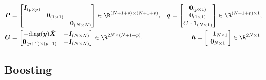         \begin{equation}
            \begin{aligned}
                & \bm{P} = \begin{bmatrix} 
                                \bm{I}_{(\nfeat \times \nfeat)} &  &  \\
                                 & 0_{(1 \times 1)} & \\
                                 & & \bm{0}_{(\ndata \times \ndata)}
                         \end{bmatrix} \in \R^{(\ndata + 1 + \nfeat) \times (\ndata + 1 + \nfeat)},
                & \bm{q} = \begin{bmatrix}
                    \bm{0}_{(\nfeat \times 1)}\\
                    0_{(1 \times 1)} \\
                    C \cdot \bm{1}_{(\ndata \times 1)}
                \end{bmatrix} \in \R^{(\ndata + 1 + \nfeat) \times 1}, \\
                & \bm{G} = \begin{bmatrix}
                    -\text{diag}(\bm{y}) \hat{\bm{X}} & -\bm{I}_{(\ndata \times \ndata)} \\
                    \bm{0}_{(\nfeat + 1) \times (\nfeat + 1)} & -\bm{I}_{(\ndata \times \ndata)}
                \end{bmatrix} \in \R^{2\ndata \times (\ndata + 1 + \nfeat)},
                & \bm{h} = \begin{bmatrix} -\bm{1}_{\ndata \times 1} \\ \bm{0}_{\ndata \times 1} \end{bmatrix}\in \R^{2\ndata \times 1}.
            \end{aligned}
        \end{equation}


        
\subsection{Boosting}
